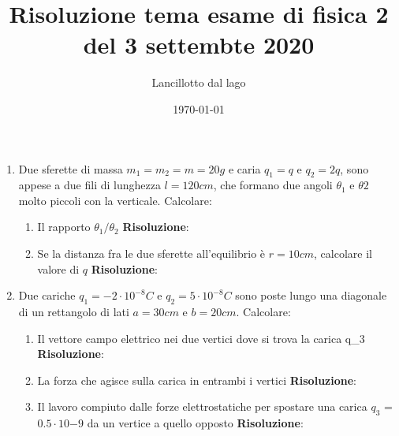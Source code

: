 \documentclass{article}
\title{Risoluzione tema esame di fisica 2 del 3 settembte 2020}
\author{Lancillotto dal lago}
\date{\today}
\begin{document}
\maketitle

\begin{enumerate}
    
    \item Due sferette di massa $m_1 = m_2 = m = 20g$ e caria $q_1 = q$ e $q_2 = 2q$, sono appese a
    due fili di lunghezza $l = 120cm$, che formano due angoli $\theta_1$ e $\theta2$ molto piccoli
    con la verticale. Calcolare:
    
    \begin{enumerate}
        \item Il rapporto $\theta_1 / \theta_2$
        \newline 
        \textbf{Risoluzione}:
        \item Se la distanza fra le due sferette all’equilibrio è $r = 10cm$, calcolare il valore di $q$
        \newline 
        \textbf{Risoluzione}:

    \end{enumerate}

    \item Due cariche $q_1 = -2 \cdot 10^{-8} C$ e $q_2 = 5 \cdot 10^{-8} C$ sono poste lungo una diagonale di un
    rettangolo di lati $a = 30cm$ e $b = 20cm$. Calcolare:

    \begin{enumerate}
        
        \item Il vettore campo elettrico nei due vertici dove si trova la carica q_3
        \newline 
        \textbf{Risoluzione}:

        \item La forza che agisce sulla carica in entrambi i vertici
        \newline 
        \textbf{Risoluzione}:

        \item Il lavoro compiuto dalle forze elettrostatiche per spostare una carica $q_3$
        = $0.5 \cdot 10{-9}$ da un vertice a quello opposto
        \newline 
        \textbf{Risoluzione}:

    \end{enumerate}


\end{enumerate}
\end{document}
